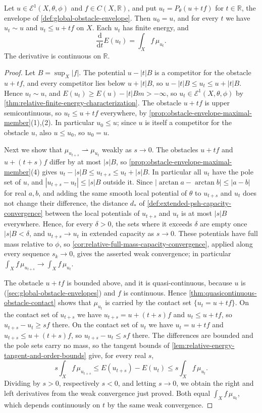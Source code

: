 \begin{proposition}\label{prop:projected-energy-first-variation}
Let $u\in\mathcal E^1(X,\theta,\phi)$ and $f\in C(X,\mathbb R)$, and put $u_t=P_\theta(u+tf)$ for $t\in\mathbb R$, the envelope of \cref{def:global-obstacle-envelope}. Then $u_0=u$, and for every $t$ we have $u_t\sim u$ and $u_t\leq u+tf$ on $X$. Each $u_t$ has finite energy, and
\[
 \frac{\mathrm d}{\mathrm dt}E(u_t)=\int_Xf\,\mu_{u_t}.
\]
The derivative is continuous on $\mathbb R$.
\end{proposition}
\begin{proof}
Let $B=\sup_X|f|$. The potential $u-|t|B$ is a competitor for the obstacle $u+tf$, and every competitor lies below $u+|t|B$, so $u-|t|B\leq u_t\leq u+|t|B$. Hence $u_t\sim u$, and $E(u_t)\geq E(u)-|t|Bm>-\infty$, so $u_t\in\mathcal E^1(X,\theta,\phi)$ by \cref{thm:relative-finite-energy-characterization}. The obstacle $u+tf$ is upper semicontinuous, so $u_t\leq u+tf$ everywhere, by \cref{prop:obstacle-envelope-maximal-member}(1),(2). In particular $u_0\leq u$; since $u$ is itself a competitor for the obstacle $u$, also $u\leq u_0$, so $u_0=u$.

Next we show that $\mu_{u_{t+s}}\rightharpoonup\mu_{u_t}$ weakly as $s\to0$. The obstacles $u+tf$ and $u+(t+s)f$ differ by at most $|s|B$, so \cref{prop:obstacle-envelope-maximal-member}(4) gives $u_t-|s|B\leq u_{t+s}\leq u_t+|s|B$. In particular all $u_t$ have the pole set of $u$, and $|u_{t+s}-u_t|\leq|s|B$ outside it. Since $|\arctan a-\arctan b|\leq|a-b|$ for real $a,b$, and adding the same smooth local potential of $\theta$ to $u_{t+s}$ and $u_t$ does not change their difference, the distance $d_*$ of \cref{def:extended-psh-capacity-convergence} between the local potentials of $u_{t+s}$ and $u_t$ is at most $|s|B$ everywhere. Hence, for every $\delta>0$, the sets where it exceeds $\delta$ are empty once $|s|B<\delta$, and $u_{t+s}\to u_t$ in extended capacity as $s\to0$. These potentials have full mass relative to $\phi$, so \cref{cor:relative-full-mass-capacity-convergence}, applied along every sequence $s_k\to0$, gives the asserted weak convergence; in particular $\int_Xf\,\mu_{u_{t+s}}\to\int_Xf\,\mu_{u_t}$.

The obstacle $u+tf$ is bounded above, and it is quasi-continuous, because $u$ is (\cref{sec:global-obstacle-envelopes}) and $f$ is continuous. Hence \cref{thm:quasicontinuous-obstacle-contact} shows that $\mu_{u_t}$ is carried by the contact set $\{u_t=u+tf\}$. On the contact set of $u_{t+s}$ we have $u_{t+s}=u+(t+s)f$ and $u_t\leq u+tf$, so $u_{t+s}-u_t\geq sf$ there. On the contact set of $u_t$ we have $u_t=u+tf$ and $u_{t+s}\leq u+(t+s)f$, so $u_{t+s}-u_t\leq sf$ there. The differences are bounded and the pole sets carry no mass, so the tangent bounds of \cref{lem:relative-energy-tangent-and-order-bounds} give, for every real $s$,
\[
 s\int_Xf\,\mu_{u_{t+s}}
 \leq E(u_{t+s})-E(u_t)
 \leq s\int_Xf\,\mu_{u_t}.
\]
Dividing by $s>0$, respectively $s<0$, and letting $s\to0$, we obtain the right and left derivatives from the weak convergence just proved. Both equal $\int_Xf\,\mu_{u_t}$, which depends continuously on $t$ by the same weak convergence.
\end{proof}

